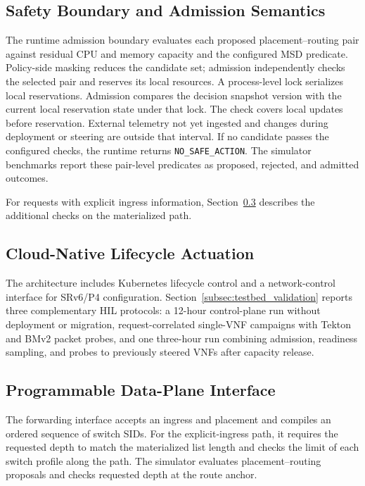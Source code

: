\documentclass[final,5p]{elsarticle}
\newcommand{\rev}[1]{\textcolor{revisiongreen}{#1}}
\let\newrev\rev
\begin{document}
\subsection{Safety Boundary and Admission Semantics}
\label{subsec:safety_boundary}
\label{subsec:freshness_revalidation}

\newrev{The runtime admission boundary evaluates each proposed placement--routing pair against residual CPU and memory capacity and the configured MSD predicate. Policy-side masking reduces the candidate set; admission independently checks the selected pair and reserves its local resources. A process-level lock serializes local reservations. Admission compares the decision snapshot version with the current local reservation state under that lock. The check covers local updates before reservation. External telemetry not yet ingested and changes during deployment or steering are outside that interval. If no candidate passes the configured checks, the runtime returns \texttt{NO\_SAFE\_ACTION}. The simulator benchmarks report these pair-level predicates as proposed, rejected, and admitted outcomes.}

\newrev{For requests with explicit ingress information, Section~\ref{subsec:data_plane_interface} describes the additional checks on the materialized path.}

\subsection{Cloud-Native Lifecycle Actuation}
\label{subsec:cloud_native_actuation}

\newrev{The architecture includes Kubernetes lifecycle control and a network-control interface for SRv6/P4 configuration. Section~\ref{subsec:testbed_validation} reports three complementary HIL protocols: a 12-hour control-plane run without deployment or migration, request-correlated single-VNF campaigns with Tekton and BMv2 packet probes, and one three-hour run combining admission, readiness sampling, and probes to previously steered VNFs after capacity release.}

\subsection{Programmable Data-Plane Interface}
\label{subsec:data_plane_interface}

\newrev{The forwarding interface accepts an ingress and placement and compiles an ordered sequence of switch SIDs. For the explicit-ingress path, it requires the requested depth to match the materialized list length and checks the limit of each switch profile along the path. The simulator evaluates placement--routing proposals and checks requested depth at the route anchor.}
\end{document}
